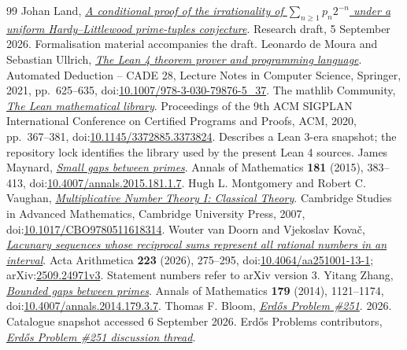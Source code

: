 \documentclass[11pt]{article}
\begin{document}
\begin{thebibliography}{99}
 Johan Land, \href{https://github.com/beetree/math_erdos_251}{\emph{A conditional proof of the irrationality of $\sum_{n\ge1}p_n2^{-n}$ under a uniform Hardy--Littlewood prime-tuples conjecture}}.
  Research draft, 5 September 2026. Formalisation material accompanies the draft.
 Leonardo de Moura and Sebastian Ullrich, \href{https://doi.org/10.1007/978-3-030-79876-5_37}{\emph{The Lean 4 theorem prover and programming language}}.
  Automated Deduction -- CADE 28, Lecture Notes in Computer Science, Springer, 2021, pp.~625--635, doi:\href{https://doi.org/10.1007/978-3-030-79876-5_37}{10.1007/978-3-030-79876-5\_37}.
 {The mathlib Community}, \href{https://doi.org/10.1145/3372885.3373824}{\emph{The Lean mathematical library}}.
  Proceedings of the 9th ACM SIGPLAN International Conference on Certified Programs and Proofs, ACM, 2020, pp.~367--381, doi:\href{https://doi.org/10.1145/3372885.3373824}{10.1145/3372885.3373824}. Describes a Lean 3-era snapshot; the repository lock identifies the library used by the present Lean 4 sources.
 James Maynard, \href{https://doi.org/10.4007/annals.2015.181.1.7}{\emph{Small gaps between primes}}.
  Annals of Mathematics \textbf{181} (2015), 383--413, doi:\href{https://doi.org/10.4007/annals.2015.181.1.7}{10.4007/annals.2015.181.1.7}.
 Hugh L. Montgomery and Robert C. Vaughan, \href{https://doi.org/10.1017/CBO9780511618314}{\emph{Multiplicative Number Theory I: Classical Theory}}.
  Cambridge Studies in Advanced Mathematics, Cambridge University Press, 2007, doi:\href{https://doi.org/10.1017/CBO9780511618314}{10.1017/CBO9780511618314}.
 Wouter van Doorn and Vjekoslav Kova\v{c}, \href{https://arxiv.org/abs/2509.24971v3}{\emph{Lacunary sequences whose reciprocal sums represent all rational numbers in an interval}}.
  Acta Arithmetica \textbf{223} (2026), 275--295, doi:\href{https://doi.org/10.4064/aa251001-13-1}{10.4064/aa251001-13-1}; arXiv:\href{https://arxiv.org/abs/2509.24971v3}{2509.24971v3}. Statement numbers refer to arXiv version 3.
 Yitang Zhang, \href{https://doi.org/10.4007/annals.2014.179.3.7}{\emph{Bounded gaps between primes}}.
  Annals of Mathematics \textbf{179} (2014), 1121--1174, doi:\href{https://doi.org/10.4007/annals.2014.179.3.7}{10.4007/annals.2014.179.3.7}.
 Thomas F. Bloom, \href{https://www.erdosproblems.com/251}{\emph{Erd\H{o}s Problem \#251}}.
  2026. Catalogue snapshot accessed 6 September 2026.
 {Erdős Problems contributors}, \href{https://www.erdosproblems.com/forum/thread/251}{\emph{Erd\H{o}s Problem \#251 discussion thread}}.

\end{thebibliography}
\end{document}
